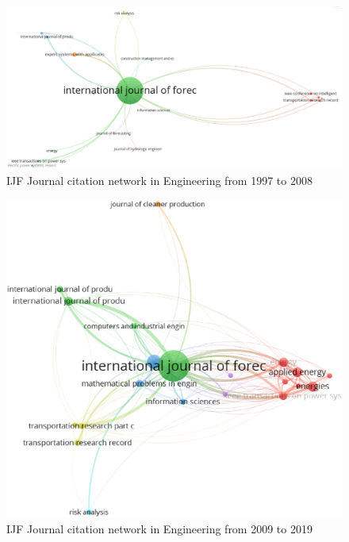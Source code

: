 \documentclass[11pt,a4paper]{elsarticle} %
\begin{document}
\begin{figure}[htbp]
\centering
\includegraphics[scale=0.3]{fig.12.eps}
\caption{IJF Journal citation network in Engineering from 1997 to 2008}
\end{figure}

\begin{figure}[htbp]
\centering
\includegraphics[scale=0.5]{fig.13.eps}
\caption{IJF Journal citation network in Engineering from 2009 to 2019}
\end{figure}
\end{document}
